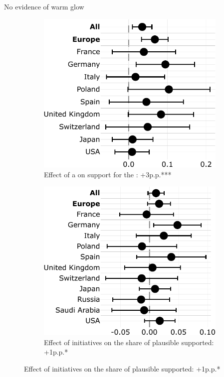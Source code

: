 \documentclass[aspectratio=169,xcolor=dvipsnames, 11pt,mathserif]{beamer}
\begin{document}
\begin{frame}{No evidence of warm glow\label{warm_glow}} 
    \begin{figure}
\begin{subfigure}{.47\textwidth}
  \caption[]{Effect of a  on support for the : +3p.p.*** \quad {}}
  \includegraphics[width=\textwidth]{../figures/country_comparison/gcs_support_by_variant_warm_glow.pdf}
\end{subfigure} \quad \pause
\begin{subfigure}{.47\textwidth}
  \caption[]{Effect of  initiatives on the share of plausible  supported: +1p.p.* \quad {} \hyperlink{2SLS}{}}
  \includegraphics[width=\textwidth]{../figures/country_comparison/share_solidarity_supported_by_info_solidarity.pdf}
\end{subfigure}
\end{figure}
\end{frame}
\end{document}
